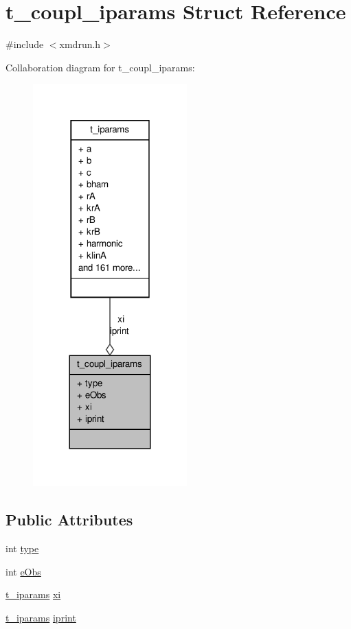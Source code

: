 \hypertarget{structt__coupl__iparams}{\section{t\-\_\-coupl\-\_\-iparams \-Struct \-Reference}
\label{structt__coupl__iparams}
}


{\ttfamily \#include $<$xmdrun.\-h$>$}



\-Collaboration diagram for t\-\_\-coupl\-\_\-iparams\-:
\nopagebreak
\begin{figure}[H]
\begin{center}
\leavevmode
\includegraphics[width=168pt]{structt__coupl__iparams__coll__graph}
\end{center}
\end{figure}
\subsection*{\-Public \-Attributes}
\begin{DoxyCompactItemize}
\item 
int \hyperlink{structt__coupl__iparams_a2d2f5373e12b6dbb64c52c575b900d7a}{type}
\item 
int \hyperlink{structt__coupl__iparams_afc1c840e7d553c295aa55452b319901e}{e\-Obs}
\item 
\hyperlink{uniont__iparams}{t\-\_\-iparams} \hyperlink{structt__coupl__iparams_a043a7b69f15199df3ed806facf2a1bc0}{xi}
\item 
\hyperlink{uniont__iparams}{t\-\_\-iparams} \hyperlink{structt__coupl__iparams_a4cba20575de5ae3b41e9d9db0b2aa768}{iprint}
\end{DoxyCompactItemize}


